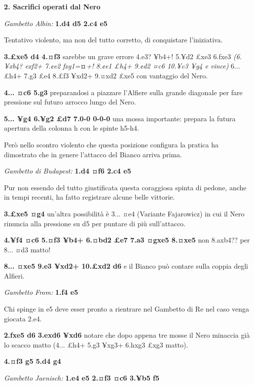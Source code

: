 \textbf{2. Sacrifici operati dal Nero}

\emph{Gambetto Albin:} \textbf{1.d4 d5 2.c4 e5}


Tentativo violento, ma non del tutto corretto, di conquistare
l'iniziativa.

\textbf{3.£xe5 d4 4.¤f3} sarebbe un grave errore 4.e3? ¥b4+! 5.¥d2 £xe3
6.fxe3 \emph{(6.¥xb4? exf2+ 7.¢e2 fxg1=}\textbf{¤}\emph{+! 8.¢e1 £h4+
9.¢d2 ¤c6 10.¥c3 ¥g4 e vince)} 6... £h4+ 7.g3 £e4 8.£f3 ¥xd2+ 9.¤xd2
£xe5 con vantaggio del Nero.

\textbf{4... ¤c6 5.g3} preparandosi a piazzare l'Alfiere sulla grande
diagonale per fare pressione sul futuro arrocco lungo del Nero.

\textbf{5... ¥g4 6.¥g2 £d7 7.0-0 0-0-0} una mossa importante: prepara la
futura apertura della colonna h con le spinte h5-h4.

Però nello scontro violento che questa posizione configura la pratica ha
dimostrato che in genere l'attacco del Bianco arriva prima.

\emph{Gambetto di Budapest:} \textbf{1.d4 ¤f6 2.c4 e5}


Pur non essendo del tutto giustificata questa coraggiosa spinta di
pedone, anche in tempi recenti, ha fatto registrare alcune belle
vittorie.

\textbf{3.£xe5 ¤g4} un'altra possibilità è 3... ¤e4 (Variante
Fajarowicz) in cui il Nero rinuncia alla pressione su d5 per puntare di
più sull'attacco.

\textbf{4.¥f4 ¤c6 5.¤f3 ¥b4+ 6.¤bd2 £e7 7.a3 ¤gxe5 8.¤xe5} non 8.axb4??
per 8... ¤d3 matto!

\textbf{8... ¤xe5 9.e3 ¥xd2+ 10.£xd2 d6} e il Bianco può contare sulla
coppia degli Alfieri.

\emph{Gambetto From:} \textbf{1.f4 e5}


Chi spinge in e5 deve esser pronto a rientrare nel Gambetto di Re nel
caso venga giocata 2.e4.

\textbf{2.fxe5 d6 3.exd6 ¥xd6} notare che dopo appena tre mosse il Nero
minaccia già lo scacco matto (4... £h4+ 5.g3 ¥xg3+ 6.hxg3 £xg3 matto).

\textbf{4.¤f3 g5 5.d4 g4}

\emph{Gambetto Jaenisch:} \textbf{1.e4 e5 2.¤f3 ¤c6 3.¥b5 f5}

